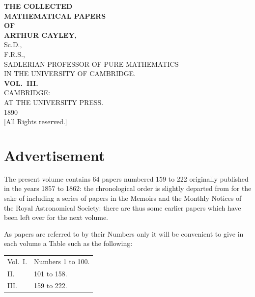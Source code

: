 \documentclass[12pt,a4paper]{article}
\theoremstyle{plain}
\begin{document}
\thispagestyle{empty}
\begin{center}
\vspace*{2cm}

{\LARGE\bfseries THE COLLECTED}\\[0.5em]
{\LARGE\bfseries MATHEMATICAL PAPERS}\\[1em]
{\large\bfseries OF}\\[1em]
{\LARGE\bfseries ARTHUR CAYLEY,}\\[0.5em]
{\large Sc.D.,}\\[0.3em]
{\large F.R.S.,}\\[0.5em]
{\large SADLERIAN PROFESSOR OF PURE MATHEMATICS}\\[0.3em]
{\large IN THE UNIVERSITY OF CAMBRIDGE.}\\[2em]

{\Huge\bfseries VOL.~III.}\\[3em]

{\large CAMBRIDGE:}\\[0.3em]
{\large AT THE UNIVERSITY PRESS.}\\[1em]
{\large 1890}\\[0.5em]
{\small [All Rights reserved.]}

\vfill
\end{center}
\clearpage

\section*{Advertisement}

The present volume contains 64 papers numbered 159 to 222 originally published in the years 1857 to 1862: the chronological order is slightly departed from for the sake of including a series of papers in the Memoirs and the Monthly Notices of the Royal Astronomical Society: there are thus some earlier papers which have been left over for the next volume.

As papers are referred to by their Numbers only it will be convenient to give in each volume a Table such as the following:

\begin{center}
\begin{tabular}{ll}
Vol.\ I. & Numbers 1 to 100. \\
\quad II. & 101 to 158. \\
\quad III. & 159 to 222.
\end{tabular}
\end{center}
\end{document}
